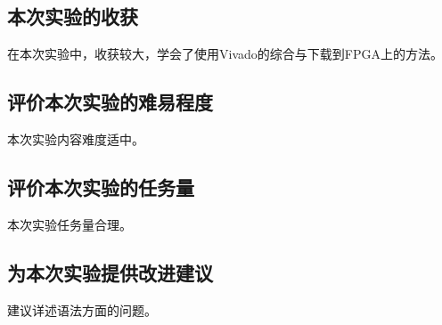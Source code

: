 \documentclass[UTF8]{article}
\begin{document}
	\subsection{本次实验的收获}
	在本次实验中，收获较大，学会了使用Vivado的综合与下载到FPGA上的方法。\par
	
	\subsection{评价本次实验的难易程度}
	本次实验内容难度适中。\par
	
	\subsection{评价本次实验的任务量}
	本次实验任务量合理。\par
	
	\subsection{为本次实验提供改进建议}
	建议详述语法方面的问题。
	
\end{document}
